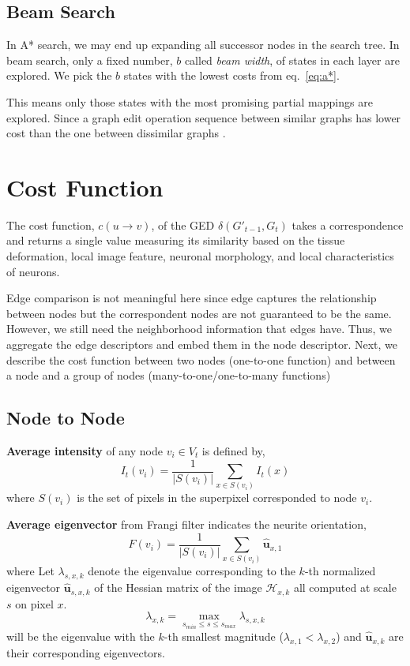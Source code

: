 \documentclass{article}
\begin{document}
\subsection{Beam Search}
In A* search, we may end up expanding all successor nodes in the search tree. In beam search, only a fixed number, $b$ called \emph{beam width}, of states in each layer are explored. We pick the $b$ states with the lowest costs from eq.~\ref{eq:a*}. 

This means only those states with the most promising partial mappings are explored. Since a graph edit operation sequence between similar graphs has lower cost than the one between dissimilar graphs \cite{neuhaus2006}.



\section{Cost Function}
The cost function, $c(u \rightarrow v)$, of the GED $\delta (G'_{t-1}, G_t)$ takes a correspondence and returns a single value measuring its similarity based on the tissue deformation, local image feature, neuronal morphology, and local characteristics of neurons.

Edge comparison is not meaningful here since edge captures the relationship between nodes but the correspondent nodes are not guaranteed to be the same. However, we still need the neighborhood information that edges have. Thus, we aggregate the edge descriptors and embed them in the node descriptor. Next, we describe the cost function between two nodes (one-to-one function) and between a node and a group of nodes (many-to-one/one-to-many functions)

\subsection{Node to Node}
\textbf{Average intensity} of any node $v_i \in V_t$ is defined by,
\begin{equation}
I_t(v_i) = \frac{1}{|S(v_i)|}\sum_{x \in S(v_i)} I_t(x)
\end{equation} 
where $S(v_i)$ is the set of pixels in the superpixel corresponded to node $v_i$.

\textbf{Average eigenvector} from Frangi filter \cite{frangi1998} indicates the neurite orientation,
\begin{equation}
F(v_i) = \frac{1}{|S(v_i)|}\sum_{x \in S(v_i)} \hat{\textbf{u}}_{x,1}
\end{equation}
where Let $\lambda_{s,x,k}$ denote the eigenvalue corresponding to the $k$-th normalized eigenvector $\hat{\textbf{u}}_{s,x,k}$
of the Hessian matrix of the image $\mathcal{H}_{x,k}$ all computed at scale $s$ on pixel $x$. 
\begin{equation}
\lambda_{x,k} = \max_{s_{min} \le s \le s_{max}} \lambda_{s,x,k}
\end{equation}
will be the eigenvalue with the $k$-th smallest magnitude ($\lambda_{x,1} < \lambda_{x,2}$) and $\hat{\textbf{u}}_{x,k}$ are their corresponding eigenvectors.
\end{document}

